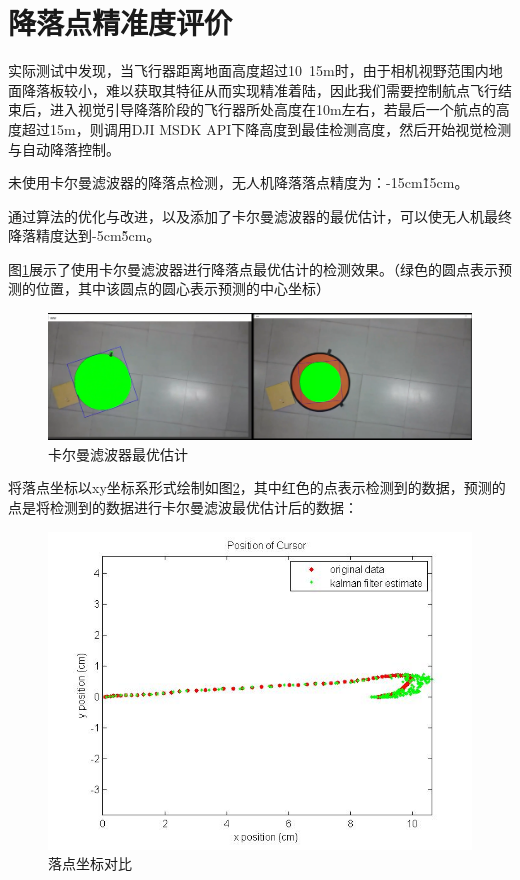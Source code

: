 \section{降落点精准度评价}

实际测试中发现，当飞行器距离地面高度超过10~15m时，由于相机视野范围内地面降落板较小，难以获取其特征从而实现精准着陆，因此我们需要控制航点飞行结束后，进入视觉引导降落阶段的飞行器所处高度在10m左右，若最后一个航点的高度超过15m，则调用DJI MSDK API下降高度到最佳检测高度，然后开始视觉检测与自动降落控制。

未使用卡尔曼滤波器的降落点检测，无人机降落落点精度为：-15cm\~15cm。

通过算法的优化与改进，以及添加了卡尔曼滤波器的最优估计，可以使无人机最终降落精度达到-5cm\~5cm。

图\ref{Fig:img19}展示了使用卡尔曼滤波器进行降落点最优估计的检测效果。（绿色的圆点表示预测的位置，其中该圆点的圆心表示预测的中心坐标）

\begin{figure}[ht]
  \centering
  \includegraphics[width=0.8\linewidth]{./Figure/Kalman_Prediction.png}
  \caption{卡尔曼滤波器最优估计}\label{Fig:img19}
\end{figure}

将落点坐标以xy坐标系形式绘制如图\ref{Fig:img20}，其中红色的点表示检测到的数据，预测的点是将检测到的数据进行卡尔曼滤波最优估计后的数据：

\begin{figure}[ht]
  \centering
  \includegraphics[width=0.8\linewidth]{./Figure/Landingpad_Kalman_Prediction.jpg}
  \caption{落点坐标对比}\label{Fig:img20}
\end{figure}

